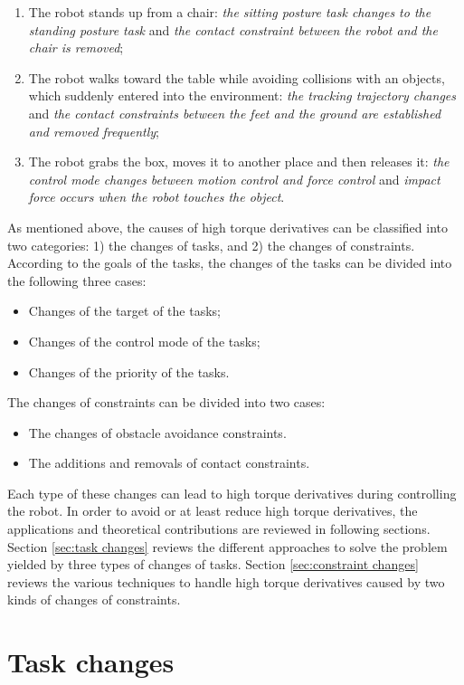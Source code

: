 \begin{enumerate}[(1)]
\item The robot stands up from a chair: \emph{the sitting posture task changes to the standing posture task} and \emph{the contact constraint between the robot and the chair is removed};
\item The robot walks toward the table while avoiding collisions with an objects, which suddenly entered into the environment: \emph{the tracking trajectory changes} and \emph{the contact constraints between the feet and the ground are established and removed frequently};
\item The robot grabs the box, moves it to another place and then releases it: \emph{the control mode changes between motion control and force control} and \emph{impact force occurs when the robot touches the object}.
\end{enumerate}

As mentioned above, the causes of high torque derivatives can be classified into two categories: 1) the changes of tasks, and 2) the changes of constraints. According to the goals of the tasks, the changes of the tasks can be divided into the following three cases:
\begin{itemize}
\item Changes of the target of the tasks;
\item Changes of the control mode of the tasks;
\item Changes of the priority of the tasks.
\end{itemize}
The changes of constraints can be divided into two cases:
\begin{itemize}
\item The changes of obstacle avoidance constraints.
\item The additions and removals of contact constraints.
\end{itemize}

Each type of these changes can lead to high torque derivatives during controlling the robot. In order to avoid or at least reduce high torque derivatives, the applications and theoretical contributions are reviewed in following sections. Section \ref{sec:task changes} reviews the different approaches to solve the problem yielded by three types of changes of tasks. Section \ref{sec:constraint changes} reviews the various techniques to handle high torque derivatives caused by two kinds of changes of constraints. 


\section{Task changes}

